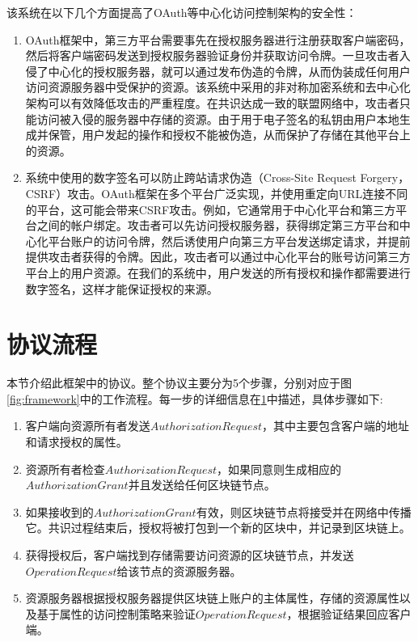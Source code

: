 该系统在以下几个方面提高了OAuth等中心化访问控制架构的安全性：

\begin{enumerate}
  \item OAuth框架中，第三方平台需要事先在授权服务器进行注册获取客户端密码，然后将客户端密码发送到授权服务器验证身份并获取访问令牌。一旦攻击者入侵了中心化的授权服务器，就可以通过发布伪造的令牌，从而伪装成任何用户访问资源服务器中受保护的资源。该系统中采用的非对称加密系统和去中心化架构可以有效降低攻击的严重程度。在共识达成一致的联盟网络中，攻击者只能访问被入侵的服务器中存储的资源。由于用于电子签名的私钥由用户本地生成并保管，用户发起的操作和授权不能被伪造，从而保护了存储在其他平台上的资源。

  \item 系统中使用的数字签名可以防止跨站请求伪造（Cross-Site Request Forgery，CSRF）攻击。OAuth框架在多个平台广泛实现，并使用重定向URL连接不同的平台，这可能会带来CSRF攻击。例如，它通常用于中心化平台和第三方平台之间的帐户绑定。攻击者可以先访问授权服务器，获得绑定第三方平台和中心化平台账户的访问令牌，然后诱使用户向第三方平台发送绑定请求，并提前提供攻击者获得的令牌。因此，攻击者可以通过中心化平台的账号访问第三方平台上的用户资源。在我们的系统中，用户发送的所有授权和操作都需要进行数字签名，这样才能保证授权的来源。
\end{enumerate}

\section{协议流程}
\label{sec:protocols}
本节介绍此框架中的协议。整个协议主要分为5个步骤，分别对应于图\ref{fig:framework}中的工作流程。每一步的详细信息在\ref{sec:protocols}中描述，具体步骤如下:

\begin{enumerate}
  \item 客户端向资源所有者发送$Authorization Request$，其中主要包含客户端的地址和请求授权的属性。
  \item 资源所有者检查$Authorization Request$，如果同意则生成相应的$Authorization Grant$并且发送给任何区块链节点。
  \item 如果接收到的$Authorization Grant$有效，则区块链节点将接受并在网络中传播它。共识过程结束后，授权将被打包到一个新的区块中，并记录到区块链上。
  \item 获得授权后，客户端找到存储需要访问资源的区块链节点，并发送$Operation Request$给该节点的资源服务器。
  \item 资源服务器根据授权服务器提供区块链上账户的主体属性，存储的资源属性以及基于属性的访问控制策略来验证$Operation Request$，根据验证结果回应客户端。
\end{enumerate}


